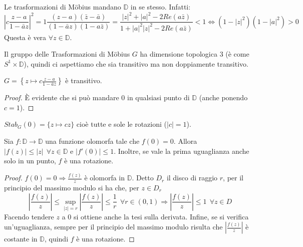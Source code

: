 \begin{osservazione}
	Le trasformazioni di Möbius mandano $\mathbb{D}$ in se stesso. Infatti: 
$$\left|c \frac{z-a}{1- \bar{a}z} \right|^2 = 1 \frac{(z-a)(\bar{z}-\bar{a})}{(1- \bar{a}z)({1- a\bar{z}})}=
\frac{|z|^2 + |a|^2 - 2Re(a \bar{z})}{1+ |a|^2 |z|^2 - 2Re(a \bar{z})} <1
\Longleftrightarrow \left( 1-|z|^2 \right) \left( 1-|a|^2 \right) >0$$
	Questa è vera $\forall z \in \mathbb{D}$.
\end{osservazione}

\begin{osservazione}
	Il gruppo delle Trasformazioni di Möbius $G$ ha dimensione topologica 3 (è come $S^1 \times \mathbb{D}$),
quindi ci aspettiamo che sia transitivo ma non doppiamente transitivo.
\end{osservazione}

\begin{lemma}
$G= \left \{ z \mapsto \displaystyle{c \frac{z-a}{1- \bar{a}z}} \right \}$ è transitivo.
\end{lemma}
\begin{proof}
	È evidente che si può mandare $0$ in qualsiasi punto di $\mathbb{D}$ (anche ponendo $c=1$).
\end{proof}

\begin{osservazione}
$Stab_G (0) = \{z \mapsto cz \}$ cioè tutte e sole le rotazioni ($|c| = 1$).
\end{osservazione}

\begin{lemma}[di Schwarz]
	Sia $f:\mathbb{D}\rightarrow \mathbb{D}$ una funzione olomorfa tale che $f(0)=0$. 
	Allora $|f(z)| \leq |z|\ \ \forall z \in \mathbb{D}$ e $|f'(0)| \leq 1$. Inoltre, se vale la prima uguaglianza anche solo in un punto, $f$ è una rotazione.
\end{lemma}
\begin{proof}
	$f(0)=0 \Rightarrow \frac{f(z)}{z}$ è olomorfa in $\mathbb{D}$. Detto $D_r$ il disco di raggio $r$,
per il principio del massimo modulo si ha che, per $z \in D_r$
\[
	\left| \frac{f(z)}{z} \right| \leq \sup_{|z|=r} \left| \frac{f(z)}{z} \right| \leq \frac{1}{r} \ \  \forall r \in (0,1)
	\Longrightarrow \left| \frac{f(z)}{z} \right| \leq 1 \ \ \forall z \in D
\]
Facendo tendere $z$ a $0$ si ottiene anche la tesi sulla derivata.
Infine, se si verifica un'uguaglianza, sempre per il principio del massimo modulo risulta che
	$\left| \frac{f(z)}{z} \right|$ è costante in $\mathbb{D}$, quindi $f$ è una rotazione.
\end{proof}

